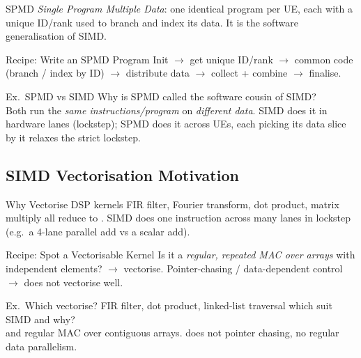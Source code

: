 \begin{concept}{SPMD}
    \emph{Single Program Multiple Data}: one identical program per UE, each with a unique ID/rank used to branch and index its data. It is the software generalisation of SIMD.
\end{concept}

\begin{KR}{Recipe: Write an SPMD Program}
    Init $\to$ get unique ID/rank $\to$ common code (branch / index by ID) $\to$ distribute data $\to$ collect + combine $\to$ finalise.
\end{KR}

\begin{example2}{Ex.\ SPMD vs SIMD}
    Why is SPMD called the software cousin of SIMD?
     \\ 
    Both run the \emph{same instructions/program} on \emph{different data}. SIMD does it in hardware lanes (lockstep); SPMD does it across UEs, each picking its data slice by  it relaxes the strict lockstep.
\end{example2}

\subsection{SIMD Vectorisation Motivation}

\begin{concept}{Why Vectorise}
    DSP kernels FIR filter, Fourier transform, dot product, matrix multiply all reduce to . SIMD does one instruction across many lanes in lockstep (e.g.\ a 4-lane parallel add vs a scalar add).
\end{concept}

\begin{KR}{Recipe: Spot a Vectorisable Kernel}
    Is it a \emph{regular, repeated MAC over arrays} with independent elements? $\to$ vectorise. Pointer-chasing / data-dependent control $\to$ does not vectorise well.
\end{KR}

\begin{example2}{Ex.\ Which vectorise?}
    FIR filter, dot product, linked-list traversal which suit SIMD and why?
     \\ 
     and  regular MAC over contiguous arrays.  does not pointer chasing, no regular data parallelism.
\end{example2}

